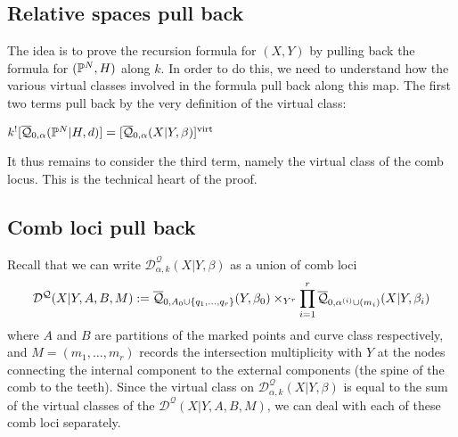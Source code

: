 \subsection{Relative spaces pull back}
The idea is to prove the recursion formula for $(X,Y)$ by pulling back the formula for $(\mathbb P^N,H)$ along $k$. In order to do this, we need to understand how the various virtual classes involved in the formula pull back along this map. The first two terms pull back by the very definition of the virtual class:
\begin{lemma} \label{Relative spaces pull back} $k^! [\overline{\mathcal Q}_{0,\alpha}(\mathbb P^N|H,d)] = [\overline{\mathcal Q}_{0,\alpha}(X|Y,\beta)]^{\operatorname{virt}}$ \end{lemma}
It thus remains to consider the third term, namely the virtual class of the comb locus. This is the technical heart of the proof.

\subsection{Comb loci pull back} \label{Subsection comb loci pull back} Recall that we can write $\mathcal D^\mathcal{Q}_{\alpha,k}(X|Y,\beta)$ as a union of comb loci
\begin{equation*} \mathcal D^{\mathcal{Q}}(X|Y,A,B,M) := \overline{\mathcal Q}_{0,A_0 \cup \{q_1, \ldots, q_r\}}(Y,\beta_0) \times_{Y^r} \prod_{i=1}^r \overline{\mathcal Q}_{0,\alpha^{(i)}\cup (m_i)}(X|Y,\beta_i) \end{equation*}
where $A$ and $B$ are partitions of the marked points and curve class respectively, and $M=(m_1,\ldots,m_r)$ records the intersection multiplicity with $Y$ at the nodes connecting the internal component to the external components (the spine of the comb to the teeth). Since the virtual class on $\mathcal D^\mathcal{Q}_{\alpha,k}(X|Y,\beta)$ is equal to the sum of the virtual classes of the $\mathcal D^{\mathcal{Q}}(X|Y,A,B,M)$, we can deal with each of these comb loci separately.


